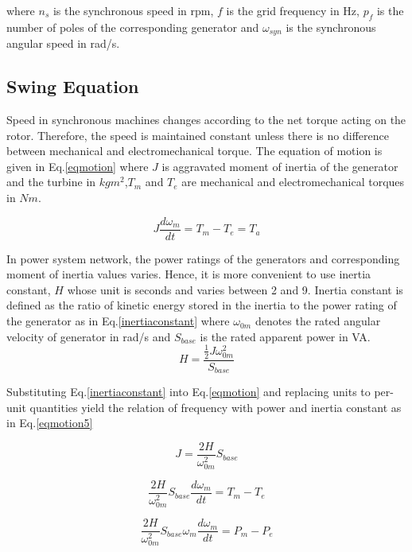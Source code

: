 where $n_{s}$ is the synchronous speed in rpm, $f$ is the grid frequency in Hz, $p_{f}$ is the number of poles of the corresponding generator and $\omega_{syn}$ is the synchronous angular speed in rad/s.

\subsection{Swing Equation}
Speed in synchronous machines changes according to the net torque acting on the rotor. Therefore, the speed is maintained constant unless there is no difference between mechanical and electromechanical torque. The equation of motion is given in Eq.\ref{eqmotion} where $J$ is aggravated moment of inertia of the generator and the turbine in $kgm^{2}$,$T_{m}$ and $T_{e}$ are mechanical and electromechanical torques in $Nm$.

\begin{equation}
J\frac{d\omega_{m}}{dt}=T_{m}-T_{e}=T_{a}
\label{eqmotion}
\end{equation}

In power system network, the power ratings of the generators and corresponding moment of inertia values varies. Hence, it is more convenient to use inertia constant, $H$ whose unit is seconds and varies between 2 and 9. Inertia constant is defined as the ratio of kinetic energy stored in the inertia to the power rating of the generator as in Eq.\ref{inertiaconstant} where $\omega_{0m}$ denotes the rated angular velocity of generator in rad/s and $S_{base}$ is the rated apparent power in VA. 
\begin{equation}
H=\frac{{\frac{1}{2}}J\omega_{0m}^{2}}{S_{base}}
\label{inertiaconstant}
\end{equation}

Substituting Eq.\ref{inertiaconstant} into Eq.\ref{eqmotion} and replacing units to per-unit quantities yield the relation of frequency with power and inertia constant as in Eq.\ref{eqmotion5}

\begin{equation}
J=\frac{2H}{\omega_{0m}^{2}}{S_{base}}
\label{inertiaconstant2}
\end{equation}

\begin{equation}
\frac{2H}{\omega_{0m}^{2}}{S_{base}}\frac{d\omega_{m}}{dt}=T_{m}-T_{e}
\label{eqmotion2}
\end{equation}

\begin{equation}
\frac{2H}{\omega_{0m}^{2}}{S_{base}\omega_{m}}\frac{d\omega_{m}}{dt}=P_{m}-P_{e}
\label{eqmotion3}
\end{equation}

